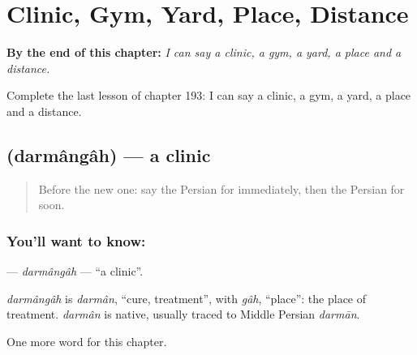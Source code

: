 
\chapter{Clinic, Gym, Yard, Place, Distance}
\label{ch:fa-clinic-gym-yard-place-distance}

\begin{chapteropening}
\textbf{By the end of this chapter:} \emph{I can say a clinic, a gym, a yard, a place and a distance.}

Complete the last lesson of chapter 193: I can say a clinic, a gym, a yard, a place and a distance.
\end{chapteropening}

\section[\texorpdfstring{\fa{درمانگاه} (darmângâh)}{درمانگاه (darmângâh)}]{ (darmângâh) — a clinic}

\label{lesson:FA-C193-darmangah}



\begin{quote}
Before the new one: say the Persian for immediately, then the Persian for soon.
\end{quote}

\subsection*{You'll want to know: }
\textbf{} — \emph{darmângâh} — \textquotedblleft{}a clinic\textquotedblright{}.

\begin{cousinweb}
\emph{darmângâh} is \emph{darmân}, \textquotedblleft{}cure, treatment\textquotedblright{}, with \emph{gâh}, \textquotedblleft{}place\textquotedblright{}: the place of treatment. \emph{darmân} is native, usually traced to Middle Persian \emph{darmān}.
\end{cousinweb}

\begin{grammarlens}[title={What you've built}]
One more word for this chapter.
\end{grammarlens}

